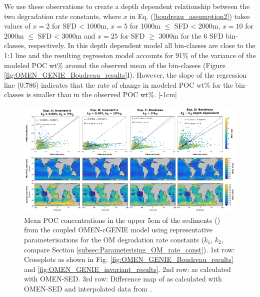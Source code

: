 \documentclass[gmd, manuscript]{copernicus}
\begin{document}
We use these observations to create a depth dependent relationship between the two degradation rate constants, where $x$ in Eq. (\ref{boudreau_assumption2}) takes values of $x=2$ for SFD < 1000m, $x=5$ for 1000m $\leq$ SFD < 2000m, 
$x=10$ for 2000m $\leq$ SFD < 3000m and $x=25$ for SFD $\geq$ 3000m for the 6 SFD bin-classes, respectively. 
In this depth dependent model all bin-classes are close to the 1:1 line and the resulting regression model accounts for 91\% of the variance of the modeled POC wt\% around the observed mean of the bin-classes (Figure \ref{fig:OMEN_GENIE_Boudreau_results}I). 
However, the slope of the regression line (0.786) indicates that the rate of change in modeled POC wt\% for the bin-classes is smaller than in the observed POC wt\%.
[-1cm]%




\begin{figure}[htbp]
\begin{center}
	\includegraphics[width=1.0\textwidth]{figures/OMEN-GENIE-Exp/0_1507_1707_COMPARE_INVARIANT_BOUDREAU_POC.pdf}
	\caption{Mean POC concentrations in the upper 5cm of the sediments () from the coupled OMEN-cGENIE model using representative parameterisations \citep[invariant and after][]{boudreau1997diagenetic} 
	for the OM degradation rate constants ($k_1$, $k_2$, compare Section \ref{subsec:Parameterising_OM_rate_const}). 
	1st row: Crossplots as shown in Fig. \ref{fig:OMEN_GENIE_Boudreau_results} and \ref{fig:OMEN_GENIE_invariant_results}. 
	2nd row:  as calculated with OMEN-SED. 
	3rd row: Difference map of  as calculated with OMEN-SED and interpolated data from \citet{seiter_organic_2004}.
	}\label{fig:OMEN_GENIE_invariant_and_Boudreau}
\end{center}
\end{figure}
\end{document}
